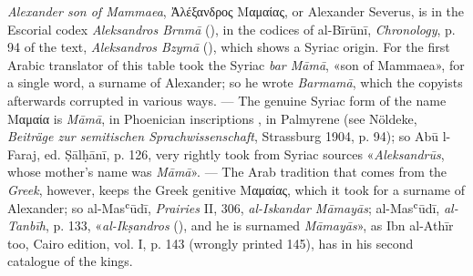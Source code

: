 \documentclass[11pt]{article}
\newcommand{\Pg}[1]{\marginpar{\footnotesize\color{gray}#1}}
\begin{document}
\par \Pg{II 195}\emph{Alexander son of Mammaea}, {\greekfont Ἀλέξανδρος Μαμαίας}, or Alexander Severus, is in the Escorial codex \emph{Aleksandros Brnmā} (), in the codices of al-Bīrūnī, \emph{Chronology}, p. 94 of the text, \emph{Aleksandros Bzymā} (), which shows a Syriac origin. For the first Arabic translator of this table took the Syriac  \emph{bar Māmā}, «son of Mammaea», for a single word, a surname of Alexander; so he wrote  \emph{Barmamā}, which the copyists afterwards corrupted in various ways. — The genuine Syriac form of the name {\greekfont Μαμαία} is  \emph{Māmā}, in Phoenician inscriptions , in Palmyrene  (see Nöldeke, \emph{Beiträge zur semitischen Sprachwissenschaft}, Strassburg 1904, p. 94); so Abū l-Faraj, ed. Ṣālḥānī, p. 126, very rightly took from Syriac sources «\emph{Aleksandrūs}, whose mother's name was \emph{Māmā}». — The Arab tradition that comes from the \emph{Greek}, however, keeps the Greek genitive {\greekfont Μαμαίας}, which it took for a surname of Alexander; so al-Masʿūdī, \emph{Prairies} II, 306, \emph{al-Iskandar Māmayās}; al-Masʿūdī, \emph{al-Tanbīh}, p. 133, «\emph{al-Ikṣandros} (), and he is surnamed \emph{Māmayās}», as Ibn al-Athīr too, Cairo edition, vol. I, p. 143 (wrongly printed 145), has in his second catalogue of the kings.\par
\end{document}
